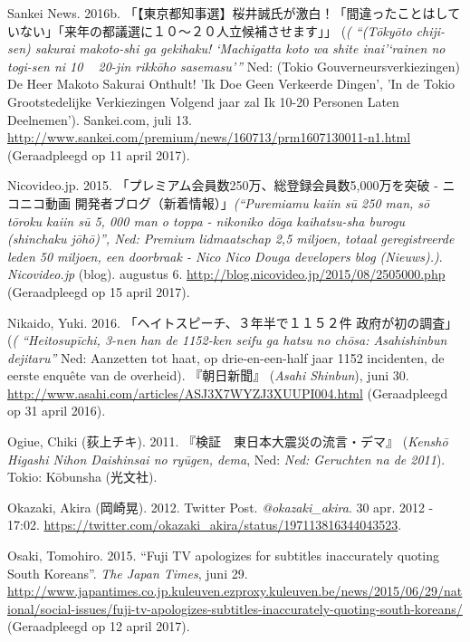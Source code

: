 \documentclass[10.5pt,dutch,]{article}
\begin{document}
\hypertarget{ref-sankeiux5fnewsux5ftokyochiji-senux5f2016-1}{}
Sankei News. 2016b. 「【東京都知事選】桜井誠氏が激白！「間違ったことはしていない」「来年の都議選に１０～２０人立候補させます」」 (\emph{( “(Tōkyōto chiji-sen) sakurai makoto-shi ga gekihaku! `Machigatta koto wa shite inai’`rainen no togi-sen ni 10 ~ 20-jin rikkōho sasemasu’”} Ned: (Tokio Gouverneursverkiezingen) De Heer Makoto Sakurai Onthult! 'Ik Doe Geen Verkeerde Dingen', 'In de Tokio Grootstedelijke Verkiezingen Volgend jaar zal Ik 10-20 Personen Laten Deelnemen'). Sankei.com, juli 13. \url{http://www.sankei.com/premium/news/160713/prm1607130011-n1.html} (Geraadpleegd op 11 april 2017).

\hypertarget{ref-nicovideo.jpux5fpuremiamuux5f2015}{}
Nicovideo.jp. 2015. 「プレミアム会員数250万、総登録会員数5,000万を突破 - ニコニコ動画 開発者ブログ（新着情報）」\emph{(“Puremiamu kaiin sū 250 man, sō tōroku kaiin sū 5, 000 man o toppa - nikoniko dōga kaihatsu-sha burogu (shinchaku jōhō)”, Ned: Premium lidmaatschap 2,5 miljoen, totaal geregistreerde leden 50 miljoen, een doorbraak - Nico Nico Douga developers blog (Nieuws).)}. \emph{Nicovideo.jp} (blog). augustus 6. \url{http://blog.nicovideo.jp/2015/08/2505000.php} (Geraadpleegd op 15 april 2017).

\hypertarget{ref-ux5fheitosupiichiux5f2016}{}
Nikaido, Yuki. 2016. 「ヘイトスピーチ、３年半で１１５２件 政府が初の調査」 (\emph{( “Heitosupīchi, 3-nen han de 1152-ken seifu ga hatsu no chōsa: Asahishinbun dejitaru”} Ned: Aanzetten tot haat, op drie-en-een-half jaar 1152 incidenten, de eerste enquête van de overheid). 『朝日新聞』 (\emph{Asahi Shinbun}), juni 30. \url{http://www.asahi.com/articles/ASJ3X7WYZJ3XUUPI004.html} (Geraadpleegd op 31 april 2016).

\hypertarget{ref-ogiueux5fkenshoux5f2011}{}
Ogiue, Chiki (荻上チキ). 2011. 『検証　東日本大震災の流言・デマ』 (\emph{Kenshō Higashi Nihon Daishinsai no ryūgen, dema}, Ned: \emph{Ned: Geruchten na de 2011}). Tokio: Kōbunsha (光文社).

\hypertarget{ref-okazakiux5ftwitterux5f2012}{}
Okazaki, Akira (岡崎晃). 2012. Twitter Post. \emph{@okazaki\_akira}. 30 apr. 2012 - 17:02. \url{https://twitter.com/okazaki_akira/status/197113816344043523}.

\hypertarget{ref-osakiux5ffujiux5f2015}{}
Osaki, Tomohiro. 2015. “Fuji TV apologizes for subtitles inaccurately quoting South Koreans”. \emph{The Japan Times}, juni 29. \url{http://www.japantimes.co.jp.kuleuven.ezproxy.kuleuven.be/news/2015/06/29/national/social-issues/fuji-tv-apologizes-subtitles-inaccurately-quoting-south-koreans/} (Geraadpleegd op 12 april 2017).
\end{document}
